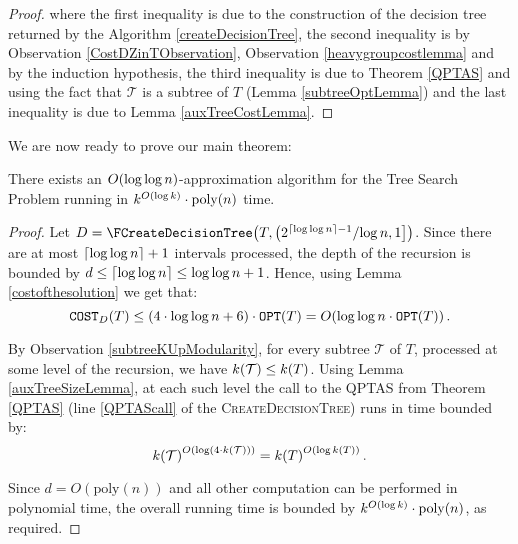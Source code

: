 \begin{lemma}
\begin{proof}
        where the first inequality is due to the construction of the decision tree returned by the Algorithm \ref{createDecisionTree}, the second inequality is by Observation \ref{CostDZinTObservation}, Observation \ref{heavygroupcostlemma} and by the induction hypothesis, the third inequality is due to Theorem \ref{QPTAS} and using the fact that $\mathcal{T}$ is a subtree of $T$ (Lemma \ref{subtreeOptLemma}) and the last inequality is due to Lemma \ref{auxTreeCostLemma}.
        
    \end{proof}
\end{lemma}

We are now ready to prove our main theorem: 
\begin{theorem}
\label{parametrizedAlgorithm}
    There exists an $O\mathopen{}\left( \log\log n \right)$-approximation algorithm for the Tree Search Problem running in $k^{O\mathopen{}\left( \log k \right)}\cdot\text{poly}\mathopen{}\left( n \right)$ time.
    \begin{proof}
        Let $D = \FCreateDecisionTree\br{T, \left({2^{\cl{\log\log n}-1}}/{\log n},1\right]}$. Since there are at most $\mathopen{}\left\lceil \log\log n \right\rceil+1$ intervals processed, the depth of the recursion is bounded by 
        $
        d \leq \mathopen{}\left\lceil \log\log n \right\rceil \leq \log\log n + 1
        $.
        Hence, using Lemma \ref{costofthesolution} we get that:
        $$
        \texttt{COST}_{D}\mathopen{}\left( T \right) \leq (4 \cdot \log\log n + 6) \cdot \texttt{OPT}\mathopen{}\left( T \right) = O\mathopen{}\left( \log\log n \cdot \texttt{OPT}\mathopen{}\left( T \right) \right).
        $$

        By Observation \ref{subtreeKUpModularity}, for every subtree $\mathcal{T}$ of $T$, processed at some level of the recursion, we have $k\mathopen{}\left( \mathcal{T} \right) \leq k\mathopen{}\left( T \right)$. Using Lemma \ref{auxTreeSizeLemma}, at each such level the call to the QPTAS from Theorem \ref{QPTAS} (line \ref{QPTAScall} of the \textsc{CreateDecisionTree}) runs in time bounded by: 
        $$
        k\mathopen{}\left( \mathcal{T} \right)^{O\mathopen{}\left( \log (4 \cdot k\mathopen{}\left( \mathcal{T} \right)) \right)} = k\mathopen{}\left( T \right)^{O\mathopen{}\left( \log k\mathopen{}\left( T \right) \right)}.
        $$
        
        Since $d = O(\text{poly}(n))$ and all other computation can be performed in polynomial time, the overall running time is bounded by 
        $
        k^{O\mathopen{}\left( \log k \right)} \cdot \text{poly}\mathopen{}\left( n \right)
        $,
        as required.
    \end{proof}
\end{theorem}


